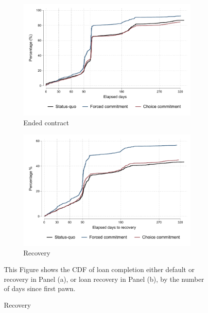 \begin{figure}[H]
        \caption{Survival graph}
    \label{survival_graph}
    \begin{center}
   \begin{subfigure}{0.49\textwidth}
   \caption{Ended contract}
        \centering
        \includegraphics[width=\textwidth]{Figuras/survival_graph_ended.pdf}
    \end{subfigure} 
   \begin{subfigure}{0.49\textwidth}
   \caption{Recovery}
        \centering
        \includegraphics[width=\textwidth]{Figuras/survival_graph_unpledge.pdf}
    \end{subfigure}     
    \end{center}
     \scriptsize  This Figure shows the CDF of loan completion either default or recovery in Panel (a), or loan recovery in Panel (b), by the number of days since first pawn.
\end{figure}

